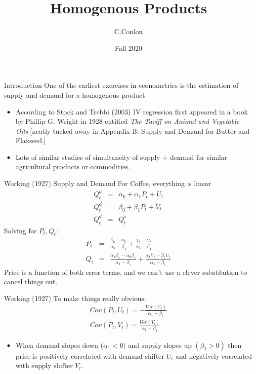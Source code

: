 \documentclass[xcolor=pdftex,dvipsnames,table,mathserif,aspectratio=169]{beamer}
\title [Homogenous Products]{Homogenous Products}
\author{C.Conlon}
\institute{Grad IO }
\date{Fall 2020}
\begin{document}
\begin{frame}
\titlepage
\end{frame}

\begin{frame}{Introduction}
One of the earliest exercises in econometrics is the estimation of supply and demand for a homogenous product
\begin{itemize}
\item According to Stock and Trebbi (2003) IV regression first appeared in a book by Phillip G. Wright in 1928 entitled \textit{The Tariff on Animal and Vegetable Oils} [neatly tucked away in Appendix B:  Supply and Demand for Butter and Flaxseed.]
\item Lots of similar studies of simultaneity of supply + demand for similar agricultural products or commodities.
\end{itemize}
\end{frame}

\begin{frame}{Working (1927)}
Supply and Demand For Coffee, everything is linear
\begin{eqnarray*}
Q_t^d &=& \alpha_0 + \alpha_1 P_t + U_t\\
Q_t^d &=& \beta_0 + \beta_1 P_t + V_t\\
Q_t^d &=& Q_t^s
\end{eqnarray*}
Solving for $P_t,Q_t$:
\begin{eqnarray*}
P_t &=& \frac{\beta_0 - \alpha_0}{\alpha_1 - \beta_1} + \frac{V_t - U_t}{\alpha_1 - \beta_1}\\
Q_t &=& \frac{\alpha_1 \beta_0 - \alpha_0 \beta_1}{\alpha_1 - \beta_1} + \frac{\alpha_1 V_t - \beta_1 U_t}{\alpha_1 - \beta_1}
\end{eqnarray*}
Price is a function of both error terms, and we can't use a clever substitution to cancel things out.
\end{frame}

\begin{frame}{Working (1927)}
To make things really obvious:
\begin{eqnarray*}
Cov(P_t,U_t) = - \frac{Var(U_t)}{\alpha_1 -\beta_1} \\
Cov(P_t,V_t) =  \frac{Var(V_t)}{\alpha_1 -\beta_1} 
\end{eqnarray*}
\begin{itemize}
\item When demand slopes down ($\alpha_1 < 0)$ and supply slopes up $(\beta_1 > 0)$ then price is positively correlated with demand shifter $U_t$ and negatively correlated with supply shifter $V_t$.
\end{itemize}
\end{frame}
\end{document}
